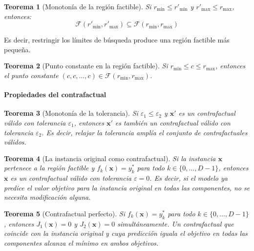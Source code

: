 \documentclass[12pt]{report} %
\newtheorem{theorem}{Teorema}
\begin{document}
\begin{theorem}[Monotonía de la región factible]\label{thm:cf-feasible-mono}
    Si $r_{\min} \leq r'_{\min}$ y $r'_{\max} \leq r_{\max}$, entonces:
    $$\mathcal{F}(r'_{\min}, r'_{\max}) \subseteq \mathcal{F}(r_{\min}, r_{\max})$$
\end{theorem}
Es decir, restringir los límites de búsqueda produce una región factible más pequeña.

\begin{theorem}[Punto constante en la región factible]\label{thm:cf-feasible-const}
    Si $r_{\min} \leq c \leq r_{\max}$, entonces el punto constante $(c, c, \ldots, c) \in \mathcal{F}(r_{\min}, r_{\max})$.
\end{theorem}

\paragraph{Propiedades del contrafactual}

\begin{theorem}[Monotonía de la tolerancia]\label{thm:cf-valid-eps-mono}
    Si $\varepsilon_1 \leq \varepsilon_2$ y $\mathbf{x}'$ es un contrafactual válido con tolerancia $\varepsilon_1$, entonces $\mathbf{x}'$ es también un contrafactual válido con tolerancia $\varepsilon_2$. Es decir, relajar la tolerancia amplía el conjunto de contrafactuales válidos.
\end{theorem}

\begin{theorem}[La instancia original como contrafactual]\label{thm:cf-instance-valid}
    Si la instancia $\mathbf{x}$ pertenece a la región factible y $f_k(\mathbf{x}) = y^*_k$ para todo $k \in \{0, \ldots, D-1\}$, entonces $\mathbf{x}$ es un contrafactual válido con tolerancia $\varepsilon = 0$. Es decir, si el modelo ya predice el valor objetivo para la instancia original en todas las componentes, no se necesita modificación alguna.
\end{theorem}

\begin{theorem}[Contrafactual perfecto]\label{thm:cf-perfect}
    Si $f_k(\mathbf{x}) = y^*_k$ para todo $k \in \{0, \ldots, D-1\}$, entonces $J_1(\mathbf{x}) = 0$ y $J_2(\mathbf{x}) = 0$ simultáneamente. Un contrafactual que coincide con la instancia original y cuya predicción iguala el objetivo en todas las componentes alcanza el mínimo en ambos objetivos.
\end{theorem}
\end{document}
